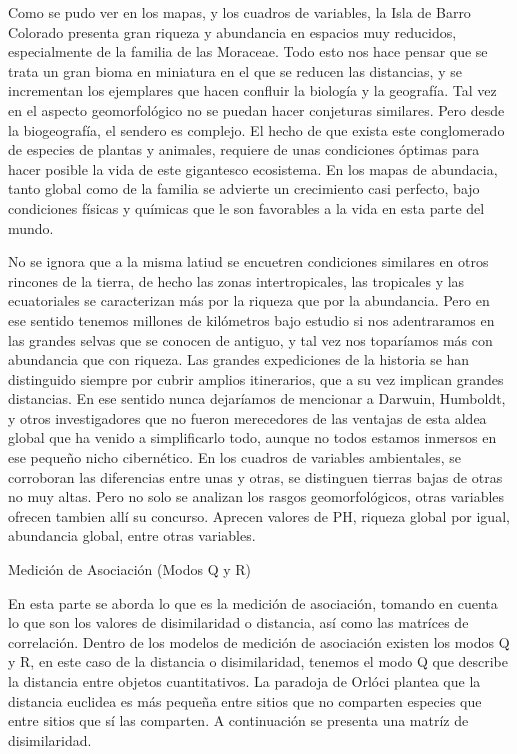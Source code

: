 \documentclass[11pt,]{article}
\begin{document}
Como se pudo ver en los mapas, y los cuadros de variables, la Isla de
Barro Colorado presenta gran riqueza y abundancia en espacios muy
reducidos, especialmente de la familia de las Moraceae. Todo esto nos
hace pensar que se trata un gran bioma en miniatura en el que se reducen
las distancias, y se incrementan los ejemplares que hacen confluir la
biología y la geografía. Tal vez en el aspecto geomorfológico no se
puedan hacer conjeturas similares. Pero desde la biogeografía, el
sendero es complejo. El hecho de que exista este conglomerado de
especies de plantas y animales, requiere de unas condiciones óptimas
para hacer posible la vida de este gigantesco ecosistema. En los mapas
de abundacia, tanto global como de la familia se advierte un crecimiento
casi perfecto, bajo condiciones físicas y químicas que le son favorables
a la vida en esta parte del mundo.

No se ignora que a la misma latiud se encuetren condiciones similares en
otros rincones de la tierra, de hecho las zonas intertropicales, las
tropicales y las ecuatoriales se caracterizan más por la riqueza que por
la abundancia. Pero en ese sentido tenemos millones de kilómetros bajo
estudio si nos adentraramos en las grandes selvas que se conocen de
antiguo, y tal vez nos toparíamos más con abundancia que con riqueza.
Las grandes expediciones de la historia se han distinguido siempre por
cubrir amplios itinerarios, que a su vez implican grandes distancias. En
ese sentido nunca dejaríamos de mencionar a Darwuin, Humboldt, y otros
investigadores que no fueron merecedores de las ventajas de esta aldea
global que ha venido a simplificarlo todo, aunque no todos estamos
inmersos en ese pequeño nicho cibernético. En los cuadros de variables
ambientales, se corroboran las diferencias entre unas y otras, se
distinguen tierras bajas de otras no muy altas. Pero no solo se analizan
los rasgos geomorfológicos, otras variables ofrecen tambien allí su
concurso. Aprecen valores de PH, riqueza global por igual, abundancia
global, entre otras variables.

Medición de Asociación (Modos Q y R)

En esta parte se aborda lo que es la medición de asociación, tomando en
cuenta lo que son los valores de disimilaridad o distancia, así como las
matríces de correlación. Dentro de los modelos de medición de asociación
existen los modos Q y R, en este caso de la distancia o disimilaridad,
tenemos el modo Q que describe la distancia entre objetos cuantitativos.
La paradoja de Orlóci plantea que la distancia euclidea es más pequeña
entre sitios que no comparten especies que entre sitios que sí las
comparten. A continuación se presenta una matríz de disimilaridad.
\end{document}
